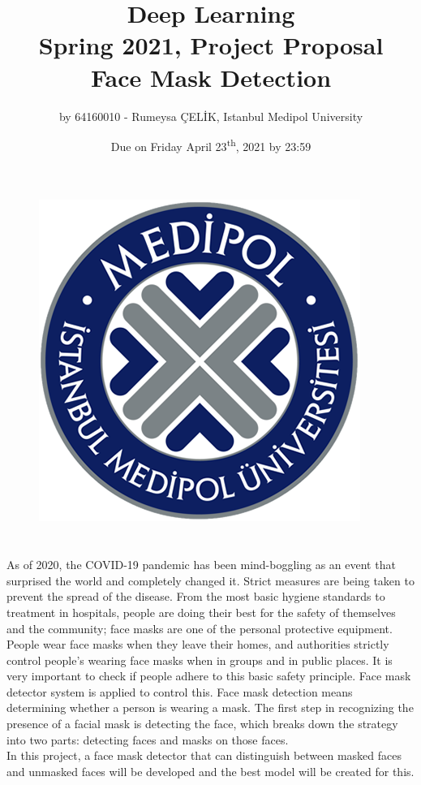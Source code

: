\documentclass[a4paper, 12pt]{article}
\newcommand\nth{\textsuperscript{th}\xspace}
\begin{document}
\begin{figure}
\includegraphics[scale=.43]{medipol.png}
\centering
\end{figure}
\begin{titlepage}
\title{Deep Learning \\ Spring 2021, Project Proposal\\ Face Mask Detection}
\date{Due on Friday April 23\nth, 2021 by 23:59}
\author{by 64160010 - Rumeysa ÇELİK, Istanbul Medipol University}
\maketitle
\end{titlepage}
\tableofcontents
\newpage
\section{}

As of 2020, the COVID-19 pandemic has been mind-boggling as an event that surprised the world and completely changed it. Strict measures are being taken to prevent the spread of the disease. From the most basic hygiene standards to treatment in hospitals, people are doing their best for the safety of themselves and the community; face masks are one of the personal protective equipment. People wear face masks when they leave their homes, and authorities strictly control people's wearing face masks when in groups and in public places. It is very important to check if people adhere to this basic safety principle. Face mask detector system is applied to control this. Face mask detection means determining whether a person is wearing a mask. The first step in recognizing the presence of a facial mask is detecting the face, which breaks down the strategy into two parts: detecting faces and masks on those faces. \\
In this project, a face mask detector that can distinguish between masked faces and unmasked faces will be developed and the best model will be created for this.
\\
\end{document}
